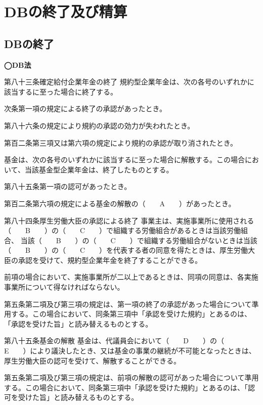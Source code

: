\section{DBの終了及び精算}

\subsection{DBの終了}

\begin{fillblank}[数理人試験 H30 問題1 設問1 A〜E]
  \noindent \textbf{◯DB法}
  \begin{lawstructure}
    \begin{lawarticle}{第八十三条}{確定給付企業年金の終了}
      規約型企業年金は、次の各号のいずれかに該当するに至った場合に終了する。

      次条第一項の規定による終了の承認があったとき。

      第八十六条の規定により規約の承認の効力が失われたとき。

      第百二条第三項又は第六項の規定により規約の承認が取り消されたとき。

      基金は、次の各号のいずれかに該当するに至った場合に解散する。この場合において、当該基金型企業年金は、終了したものとする。

      第八十五条第一項の認可があったとき。

      第百二条第六項の規定による基金の解散の（　　A　　）があったとき。
    \end{lawarticle}


    \begin{lawarticle}{第八十四条}{厚生労働大臣の承認による終了}
      事業主は、実施事業所に使用される（　　B　　）の（　　C　　）で組織する労働組合があるときは当該労働組合、
      当該（　　B　　）の（　　C　　）で組織する労働組合がないときは当該（　　B　　）の（　　C　　）を代表する者の同意を得たときは、厚生労働大臣の承認を受けて、規約型企業年金を終了することができる。

      前項の場合において、実施事業所が二以上であるときは、同項の同意は、各実施事業所について得なければならない。

      第五条第二項及び第三項の規定は、第一項の終了の承認があった場合について準用する。この場合において、同条第三項中「承認を受けた規約」とあるのは、「承認を受けた旨」と読み替えるものとする。
    \end{lawarticle}


    \begin{lawarticle}{第八十五条}{基金の解散}
      基金は、代議員会において（　　D　　）の（　　E　　）により議決したとき、又は基金の事業の継続が不可能となったときは、厚生労働大臣の認可を受けて、解散することができる。

      第五条第二項及び第三項の規定は、前項の解散の認可があった場合について準用する。この場合において、同条第三項中「承認を受けた規約」とあるのは、「認可を受けた旨」と読み替えるものとする。
    \end{lawarticle}
  \end{lawstructure}
\end{fillblank}

